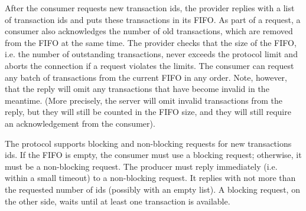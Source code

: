 After the consumer requests new transaction ids, the provider replies with a list of transaction ids and
puts these transactions in its FIFO.
As part of a request, a consumer also acknowledges the number of old transactions,
which are removed from the FIFO at the same time.
The provider checks that the size of the FIFO, i.e. the number of outstanding transactions,
never exceeds the protocol limit and aborts the connection if a request violates the limits.
The consumer can request any batch of transactions from the current FIFO in any order.
Note, however, that the reply will omit any transactions that have become invalid in the meantime.
(More precisely, the server will omit invalid transactions from the reply, but they will still be counted in the FIFO
size, and they will still require an acknowledgement from the consumer).

The protocol supports blocking and non-blocking requests for new transactions ids.
If the FIFO is empty, the consumer must use a blocking request; otherwise, it must be a non-blocking request.
The producer must reply immediately (i.e. within a small timeout) to a non-blocking request.
It replies with not more than the requested number of ids (possibly with an empty list).
A blocking request, on the other side, waits until at least one transaction is available.

